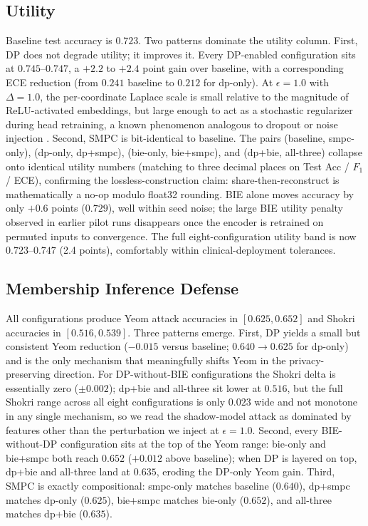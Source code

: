 \documentclass[conference]{IEEEtran}
\begin{document}
\subsection{Utility}
Baseline test accuracy is $0.723$. Two patterns dominate the utility column.  {First, DP does not degrade utility; it improves it.} Every DP-enabled configuration sits at $0.745$--$0.747$, a $+2.2$ to $+2.4$ point gain over baseline, with a corresponding ECE reduction (from $0.241$ baseline to $0.212$ for dp-only). At $\epsilon=1.0$ with $\Delta=1.0$, the per-coordinate Laplace scale is small relative to the magnitude of ReLU-activated embeddings, but large enough to act as a stochastic regularizer during head retraining, a known phenomenon analogous to dropout or noise injection \cite{ziller}.  {Second, SMPC is bit-identical to baseline.} The pairs (baseline, smpc-only), (dp-only, dp+smpc), (bie-only, bie+smpc), and (dp+bie, all-three) collapse onto identical utility numbers (matching to three decimal places on Test Acc / $F_1$ / ECE), confirming the lossless-construction claim: share-then-reconstruct is mathematically a no-op modulo float32 rounding. BIE alone moves accuracy by only $+0.6$ points ($0.729$), well within seed noise; the large BIE utility penalty observed in earlier pilot runs disappears once the encoder is retrained on permuted inputs to convergence. The full eight-configuration utility band is now $0.723$--$0.747$ (2.4 points), comfortably within clinical-deployment tolerances.

\subsection{Membership Inference Defense}
All configurations produce Yeom attack accuracies in $[0.625, 0.652]$ and Shokri accuracies in $[0.516, 0.539]$. Three patterns emerge.  {First, DP yields a small but consistent Yeom reduction} ($-0.015$ versus baseline; $0.640 \to 0.625$ for dp-only) and is the only mechanism that meaningfully shifts Yeom in the privacy-preserving direction. For DP-without-BIE configurations the Shokri delta is essentially zero ($\pm 0.002$); dp+bie and all-three sit lower at $0.516$, but the full Shokri range across all eight configurations is only $0.023$ wide and not monotone in any single mechanism, so we read the shadow-model attack as dominated by features other than the perturbation we inject at $\epsilon=1.0$.  {Second, every BIE-without-DP configuration sits at the top of the Yeom range}: bie-only and bie+smpc both reach $0.652$ ($+0.012$ above baseline); when DP is layered on top, dp+bie and all-three land at $0.635$, eroding the DP-only Yeom gain.  {Third, SMPC is exactly compositional}: smpc-only matches baseline ($0.640$), dp+smpc matches dp-only ($0.625$), bie+smpc matches bie-only ($0.652$), and all-three matches dp+bie ($0.635$).
\end{document}
